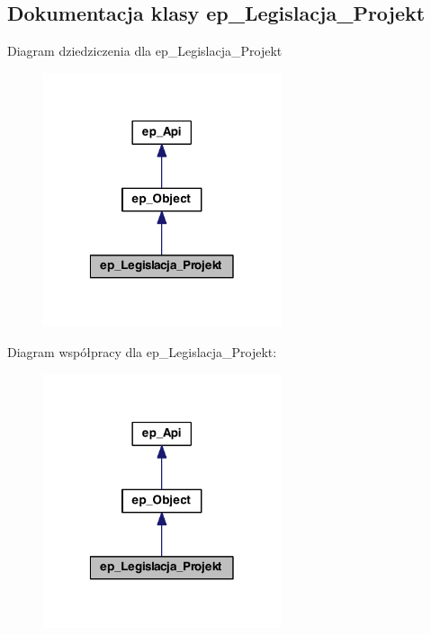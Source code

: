 \hypertarget{classep___legislacja___projekt}{\subsection{Dokumentacja klasy ep\-\_\-\-Legislacja\-\_\-\-Projekt}
\label{classep___legislacja___projekt}
}


Diagram dziedziczenia dla ep\-\_\-\-Legislacja\-\_\-\-Projekt\nopagebreak
\begin{figure}[H]
\begin{center}
\leavevmode
\includegraphics[width=198pt]{classep___legislacja___projekt__inherit__graph}
\end{center}
\end{figure}


Diagram współpracy dla ep\-\_\-\-Legislacja\-\_\-\-Projekt\-:\nopagebreak
\begin{figure}[H]
\begin{center}
\leavevmode
\includegraphics[width=198pt]{classep___legislacja___projekt__coll__graph}
\end{center}
\end{figure}
